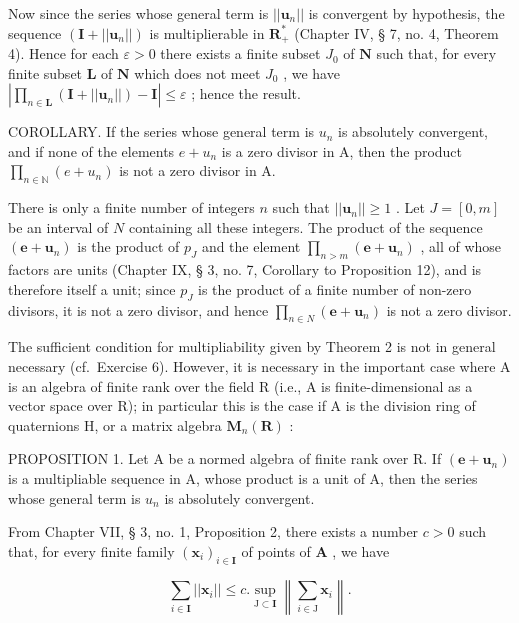 Now since the series whose general term is \(||\boldsymbol{u}_n||\) is convergent by hypothesis, the sequence \((\mathbf{I} + ||\boldsymbol{u}_n||)\) is multiplierable in \(\mathbf{R}_+^*\) (Chapter IV, § 7, no. 4, Theorem 4). Hence for each \(\varepsilon > 0\) there exists a finite subset \(J_0\) of \(\mathbf{N}\) such that, for every finite subset \(\mathbf{L}\) of \(\mathbf{N}\) which does not meet \(J_0\) , we have \(\left| \prod_{n \in \mathbf{L}} (\mathbf{I} + ||\boldsymbol{u}_n||) - \mathbf{I} \right| \leqslant \varepsilon\) ; hence the result.

COROLLARY. If the series whose general term is \(u_{n}\) is absolutely convergent, and if none of the elements \(e + u_{n}\) is a zero divisor in A, then the product \(\prod_{n \in \mathbb{N}} (e + u_{n})\) is not a zero divisor in A.

There is only a finite number of integers \(n\) such that \(||\boldsymbol{u}_n|| \geqslant 1\) . Let \(J = [0, m]\) be an interval of \(N\) containing all these integers. The product of the sequence \((\boldsymbol{e} + \boldsymbol{u}_n)\) is the product of \(p_J\) and the element \(\prod_{n > m} (\boldsymbol{e} + \boldsymbol{u}_n)\) , all of whose factors are units (Chapter IX, § 3, no. 7, Corollary to Proposition 12), and is therefore itself a unit; since \(p_J\) is the product of a finite number of non-zero divisors, it is not a zero divisor, and hence \(\prod_{n \in N} (\boldsymbol{e} + \boldsymbol{u}_n)\) is not a zero divisor.

The sufficient condition for multipliability given by Theorem 2 is not in general necessary (cf.~Exercise 6). However, it is necessary in the important case where A is an algebra of finite rank over the field R (i.e., A is finite-dimensional as a vector space over R); in particular this is the case if A is the division ring of quaternions H, or a matrix algebra \(\mathbf{M}_n(\mathbf{R})\) :

PROPOSITION 1. Let A be a normed algebra of finite rank over R. If \((\boldsymbol{e} + \boldsymbol{u}_{n})\) is a multipliable sequence in A, whose product is a unit of A, then the series whose general term is \(u_{n}\) is absolutely convergent.

From Chapter VII, § 3, no. 1, Proposition 2, there exists a number \(c > 0\) such that, for every finite family \((\pmb{x}_i)_{i \in \mathbf{I}}\) of points of \(\mathbf{A}\) , we have

\[
\sum_ {i \in \mathbf {I}} | | \boldsymbol {x} _ {i} | | \leqslant c. \sup _ {\mathrm{J} \subset \mathbf {I}} \left\| \sum_ {i \in \mathrm{J}} \boldsymbol {x} _ {i} \right\|.\tag{1}
\]


